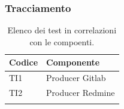 	\subsubsection{Tracciamento} \label{tracciamentointegrazione}

	\begin{table}[H]
		\centering
		{\def\arraystretch{1.4}
		\begin{tabularx}{\textwidth}{YY}
			\textbf{Codice} & \textbf{Componente} \\
			\toprule
			TI1 & Producer Gitlab \\
			TI2 & Producer Redmine \\
			\bottomrule\\
		\end{tabularx}}
		\caption{Elenco dei test in correlazioni con le compoenti.}
	\end{table}
